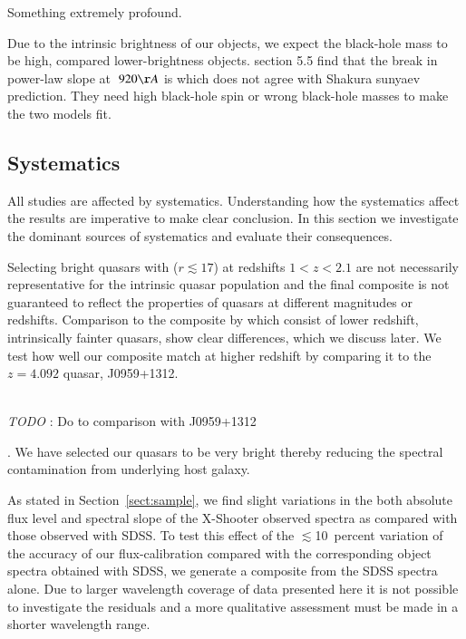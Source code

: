 \documentclass{aa}    %
\newcommand{\sectionname}{Section}
\newcommand{\Sect}[1]{\sectionname~\ref{sect:#1}}
\newcommand{\sect}[1]{\Sect{#1}}
\newcommand{\sectlabel}[1]{\label{sect:#1}}
\newcommand{\todo}[3]{{\color{#2}\emph{#1}: #3}}
\newcommand{\jstodo}[1]{\todo{ \\TODO }{red}{#1}}
\begin{document}
Something extremely profound.


Due to the intrinsic brightness of our objects, we expect the black-hole mass to be high, compared lower-brightness objects. \citet{Lusso2015} section 5.5 find that the break in power-law slope at $~920 \AA$ is which does not agree with Shakura sunyaev prediction. They need high black-hole spin or wrong black-hole masses to make the two models fit.  



\subsection{Systematics}  \sectlabel{systematics}


All studies are affected by systematics. Understanding how the systematics affect the results are imperative to make clear conclusion. In this section we investigate the dominant sources of systematics and evaluate their consequences. 


Selecting bright quasars with ($r \lesssim 17$) at redshifts $1 < z < 2.1$ are not necessarily representative for the intrinsic quasar population \citep{Paris2014} and the final composite is not guaranteed to reflect the properties of quasars at different magnitudes or redshifts. Comparison to the composite by \citep{VandenBerk2001} which consist of lower redshift, intrinsically fainter quasars, show clear differences, which we discuss later. We test how well our composite match at higher redshift by comparing it to the $z=4.092$ quasar, J0959+1312. 

\jstodo{Do to comparison with J0959+1312}


 \citep{Volonteri2010a} \citep{Hopkins2007} . We have selected our quasars to be very bright thereby reducing the spectral contamination from underlying host galaxy. 

As stated in \sect{sample}, we find slight variations in the both absolute flux level and spectral slope of the X-Shooter observed spectra as compared with those observed with SDSS. To test this effect of the $\lesssim$10~percent variation of the accuracy of our flux-calibration compared with the corresponding object spectra obtained with SDSS, we generate a composite from the SDSS spectra alone. Due to larger wavelength coverage of data presented here it is not possible to investigate the residuals and a more qualitative assessment must be made in a shorter wavelength range.
\end{document}
